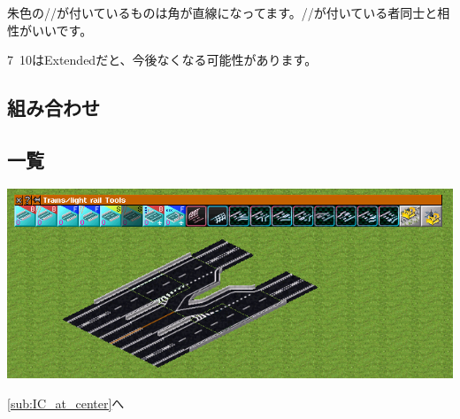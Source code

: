 \documentclass{jarticle}
\begin{document}
\vspace{5pt}
朱色の//が付いているものは角が直線になってます。//が付いている者同士と相性がいいです。

7~10はExtendedだと、今後なくなる可能性があります。


\newpage

\subsection{組み合わせ}
\subsection*{一覧}


  \includegraphics[width = 135mm]{picture/20210214-road-1-9.png}

  \ref{sub:IC_at_center}へ\\
\end{document}
